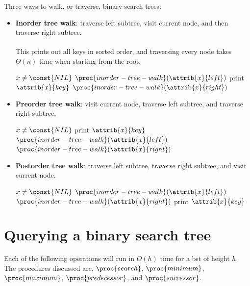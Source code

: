 \documentclass[12pt]{article}
\begin{document}
Three ways to walk, or traverse, binary search trees:
\begin{itemize}
    \item[]\textbf{Inorder tree walk}: traverse left subtree, visit current node, and then traverse right subtree. 
    \\ \\
    This prints out all keys in sorted order, and traversing every node takes $\Theta{(n)}$ time when starting from the root.
    \begin{codebox}
    \li \If $x \neq \const{NIL}$
    \li \Then
            $\proc{inorder-tree-walk}(\attrib{x}{left})$
    \li     print $\attrib{x}{key}$
    \li     $\proc{inorder-tree-walk}(\attrib{x}{right})$
    \end{codebox}

    \item[]\textbf{Preorder tree walk}: visit current node, traverse left subtree, and traverse right subtree.
    
    \begin{codebox}
    \li \If $x \neq \const{NIL}$
    \li \Then
            print $\attrib{x}{key}$
    \li     $\proc{inorder-tree-walk}(\attrib{x}{left})$
    \li     $\proc{inorder-tree-walk}(\attrib{x}{right})$
    \end{codebox}
    
    \item[]\textbf{Postorder tree walk}: traverse left subtree, traverse
        right subtree, and visit current node.
    
    \begin{codebox}
    \li \If $x \neq \const{NIL}$
    \li \Then
            $\proc{inorder-tree-walk}(\attrib{x}{left})$
    \li     $\proc{inorder-tree-walk}(\attrib{x}{right})$
    \li     print $\attrib{x}{key}$
    \end{codebox}
    
\end{itemize}

\section*{Querying a binary search tree}
Each of the following operations will run in $O(h)$ time for a bst of height $h$. The procedures discussed are, $\proc{search}$, $\proc{minimum}$, $\proc{maximum}$, $\proc{predecessor}$, and $\proc{successor}$.
\end{document}
